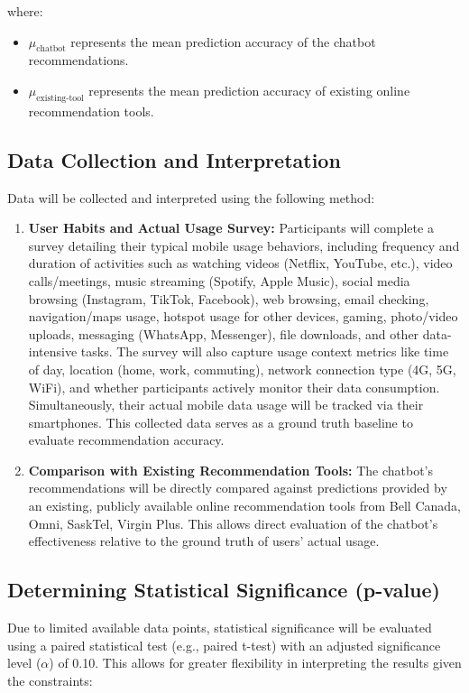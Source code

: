 \documentclass[conference]{IEEEtran}
\begin{document}
where:
\begin{itemize}
\item $\mu_{\text{chatbot}}$ represents the mean prediction accuracy of the chatbot recommendations.
\item $\mu_{\text{existing-tool}}$ represents the mean prediction accuracy of existing online recommendation tools.
\end{itemize}

\subsection{Data Collection and Interpretation}
Data will be collected and interpreted using the following method:
\begin{enumerate}
\item \textbf{User Habits and Actual Usage Survey:} Participants will complete a survey detailing their typical mobile usage behaviors, including frequency and duration of activities such as watching videos (Netflix, YouTube, etc.), video calls/meetings, music streaming (Spotify, Apple Music), social media browsing (Instagram, TikTok, Facebook), web browsing, email checking, navigation/maps usage, hotspot usage for other devices, gaming, photo/video uploads, messaging (WhatsApp, Messenger), file downloads, and other data-intensive tasks. The survey will also capture usage context metrics like time of day, location (home, work, commuting), network connection type (4G, 5G, WiFi), and whether participants actively monitor their data consumption. Simultaneously, their actual mobile data usage will be tracked via their smartphones. This collected data serves as a ground truth baseline to evaluate recommendation accuracy.
\item \textbf{Comparison with Existing Recommendation Tools:} The chatbot's recommendations will be directly compared against predictions provided by an existing, publicly available online recommendation tools from Bell Canada\cite{b20}, Omni\cite{b21}, SaskTel\cite{b22}, Virgin Plus\cite{b23}. This allows direct evaluation of the chatbot's effectiveness relative to the ground truth of users' actual usage.
\end{enumerate}

\subsection{Determining Statistical Significance (p-value)}
Due to limited available data points, statistical significance will be evaluated using a paired statistical test (e.g., paired t-test) with an adjusted significance level ($\alpha$) of 0.10. This allows for greater flexibility in interpreting the results given the constraints:
\end{document}

